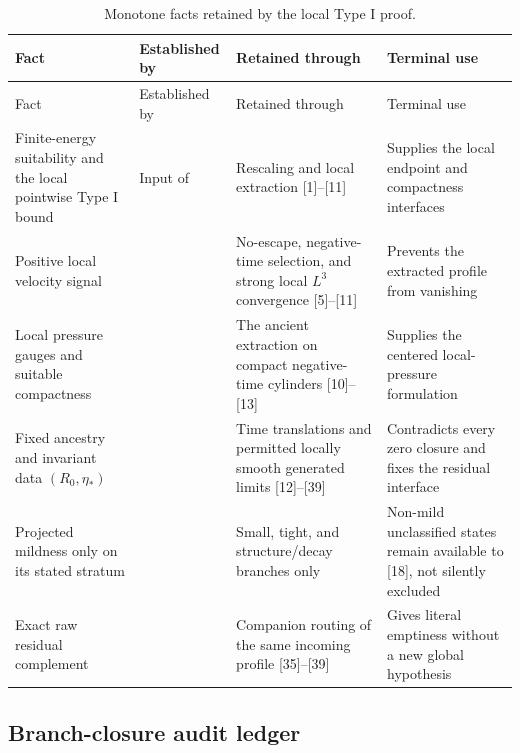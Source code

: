 \documentclass[11pt]{amsart}
\theoremstyle{plain}
\theoremstyle{definition}
\theoremstyle{remark}
\numberwithin{equation}{section}
\begin{document}
\begingroup
\small
\setlength{\tabcolsep}{3pt}
\renewcommand{\arraystretch}{1.15}
\begin{longtable}{@{}L{1.28in}L{1.62in}L{1.72in}L{1.38in}@{}}
\caption{Monotone facts retained by the local Type I proof.}
\label{tab:local-typeI-monotone-ledger}\\
\toprule
Fact & Established by & Retained through & Terminal use \\
\midrule
\endfirsthead
\toprule
Fact & Established by & Retained through & Terminal use \\
\midrule
\endhead
\bottomrule
\endfoot

Finite-energy suitability and the local pointwise Type I bound &
Input of  & Rescaling and local extraction [1]--[11] & Supplies the local endpoint and compactness interfaces \\

Positive local velocity signal &
 & No-escape, negative-time selection, and strong local \(L^3\) convergence [5]--[11] & Prevents the extracted profile from vanishing \\

Local pressure gauges and suitable compactness &
 & The ancient extraction on compact negative-time cylinders [10]--[13] & Supplies the centered local-pressure formulation \\

Fixed ancestry and invariant data \((R_0,\eta_*)\) &
 & Time translations and permitted locally smooth generated limits [12]--[39] & Contradicts every zero closure and fixes the residual interface \\

Projected mildness only on its stated stratum &
 & Small, tight, and structure/decay branches only & Non-mild unclassified states remain available to [18], not silently excluded \\

Exact raw residual complement &
 & Companion routing of the same incoming profile [35]--[39] & Gives literal emptiness without a new global hypothesis \\

\end{longtable}
\endgroup

\subsection{Branch-closure audit ledger}
\label{subsec:local-typeI-closure-ledger}
\end{document}
